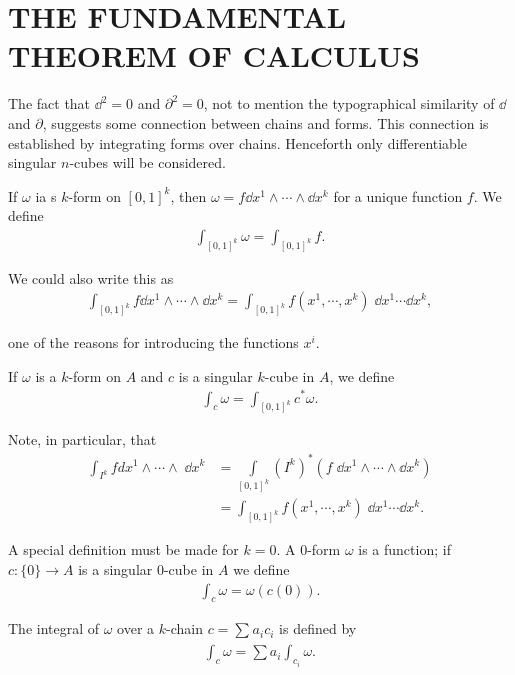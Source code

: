 \newpage
\section[\textsc{the fundamental theorem of calculus}]{THE FUNDAMENTAL THEOREM OF CALCULUS}
The fact that $\dd^2 = 0$ and $\partial^2 = 0$, not to mention the typographical 
similarity of $\dd$ and $\partial$, suggests some connection between chains and forms. 
This connection is established by integrating forms over chains. Henceforth only 
differentiable singular $n$-cubes will be considered.

If $\omega$ ia s $k$-form on $[0,1]^k$, then $\omega = f\dd x^1\wedge\cdots\wedge\dd x^k$
for a unique function $f$. We define 
\begin{align*}
  \int_{[0,1]^k} \omega = \int_{[0,1]^k} f.
\end{align*}

We could also write this as
\begin{align*}
  \int_{[0,1]^k} f\dd x^1\wedge\cdots\wedge\dd x^k = \int_{[0,1]^k} f(x^1,\cdots,x^k)\;\dd x^1\cdots\dd x^k,
\end{align*}

one of the reasons for introducing the functions $x^i$. 

If $\omega$ is a $k$-form on $A$ and $c$ is a singular $k$-cube in $A$, we define
\begin{align*}
  \int_c\omega=\int_{[0,1]^k}c^*\omega.
\end{align*}

Note, in particular, that
\begin{align*}
    \int_{I^k}fdx^1\wedge\cdots\wedge\;\dd x^k
    & = \int\limits_{[0,1]^k}(I^k)^*(f\;\dd x^1\wedge\cdots\wedge \dd x^k) \\
    & = \int_{[0,1]^k}f(x^1,\cdots,x^k)\; \dd x^1\cdots\dd x^k.
\end{align*}

A special definition must be made for $k = 0$. A 0-form $\omega$ is a function; 
if $c:\{0\}\to A$ is a singular 0-cube in $A$ we define
\begin{align*}
  \int_c \omega = \omega(c(0)).
\end{align*}

The integral of $\omega$ over a $k$-chain $c = \sum_{}^{}{a_ic_i}$ is defined by
\begin{align*}
    \int_c\omega=\sum a_i\int_{c_i}\omega.
\end{align*}

